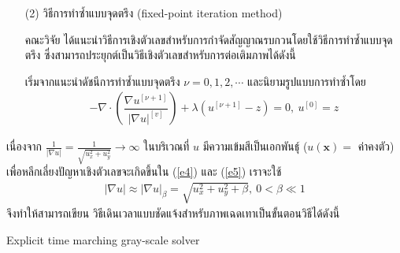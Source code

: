 \documentclass[hidelinks, a4paper,12pt]{article}
\numberwithin{equation}{section}							%
\numberwithin{equation}{section}
\begin{document}
{\begin{itemize}
	\item [(2)] วิธีการทำซ้ำแบบจุดตรึง (fixed-point iteration method)
	
	คณะวิจัย \cite{ref:FixpointSolver} ได้แนะนำวิธีการเชิงตัวเลขสำหรับการกำจัดสัญญาณรบกวนโดยใช้วิธีการทำซ้ำแบบจุดตรึง ซึ่งสามารถประยุกต์เป็นวิธีเชิงตัวเลขสำหรับการต่อเติมภาพได้ดังนี้
	
	\hspace{1cm} เริ่มจากแนะนำดัชนีการทำซ้ำแบบจุดตรึง $\nu=0,1,2,\cdots$ และนิยามรูปแบบการทำซ้ำโดย
	\begin{align}
	- \nabla\cdot\left(\dfrac{\nabla u^{[\nu+1]}}{{| \nabla u |}^{[v]} }\right) + \lambda(u^{[\nu+1]}-z)  = 0,\ u^{[0]}=z
	\label{e5}
	\end{align}
\end{itemize}

\hspace{1cm} เนื่องจาก $\tfrac{1}{| \nabla u |}=\tfrac{1}{\sqrt{u_x^2+u_y^2}} \rightarrow \infty$ ในบริเวณที่ $u$ มีความเข้มสีเป็นเอกพันธ์ุ ($u(\mathbf{x})=$ ค่าคงตัว) เพื่อหลีกเลี่ยงปัญหาเชิงตัวเลขจะเกิดขึ้นใน (\ref{e4}) และ (\ref{e5}) เราจะใช้ 
\begin{align*}
|\nabla u| \approx| \nabla u |_\beta=\sqrt{u_x^2+u_y^2+\beta},\ 0< \beta \ll 1
 \end{align*}
จึงทำให้สามารถเขียน วิธีเดินเวลาแบบชัดแจ้งสำหรับภาพเฉดเทาเป็นขั้นตอนวิธีได้ดังนี้ 
\begin{algorithm}[H]
	\caption{Explicit time marching gray-scale solver}
\end{algorithm}

}
\end{document}
